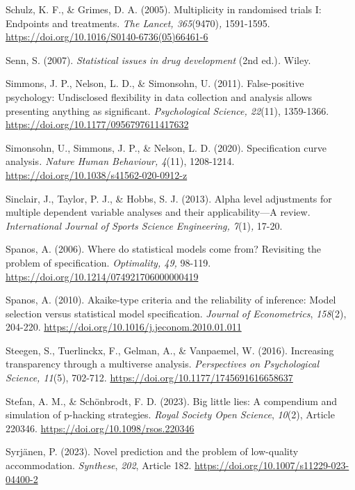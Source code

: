 \documentclass[authordate, meta, issue]{jote-new-article}
\begin{document}
Schulz, K. F., \& Grimes, D. A. (2005). Multiplicity in randomised trials I: Endpoints and treatments. \emph{The Lancet, 365}(9470)\emph{,} 1591-1595. \url{https://doi.org/10.1016/S0140-6736(05)66461-6}



Senn, S. (2007). \emph{Statistical issues in drug development }(2nd ed.)\emph{.} Wiley.



Simmons, J. P., Nelson, L. D., \& Simonsohn, U. (2011). False-positive psychology: Undisclosed flexibility in data collection and analysis allows presenting anything as significant. \emph{Psychological Science, 22}(11), 1359-1366. \url{https://doi.org/10.1177/0956797611417632}



Simonsohn, U., Simmons, J. P., \& Nelson, L. D. (2020). Specification curve analysis\emph{. Nature Human Behaviour, 4}(11), 1208-1214. \url{https://doi.org/10.1038/s41562-020-0912-z}



Sinclair, J., Taylor, P. J., \& Hobbs, S. J. (2013). Alpha level adjustments for multiple dependent variable analyses and their applicability—A review. \emph{International Journal of Sports Science Engineering, 7}(1)\emph{,} 17-20.



Spanos, A. (2006). Where do statistical models come from? Revisiting the problem of specification. \emph{Optimality, 49,} 98-119. \url{https://doi.org/10.1214/074921706000000419}



Spanos, A. (2010). Akaike-type criteria and the reliability of inference: Model selection versus statistical model specification. \emph{Journal of Econometrics}, \emph{158}(2), 204-220. \url{https://doi.org/10.1016/j.jeconom.2010.01.011}



Steegen, S., Tuerlinckx, F., Gelman, A., \& Vanpaemel, W. (2016). Increasing transparency through a multiverse analysis. \emph{Perspectives on Psychological Science, 11}(5), 702-712. \url{https://doi.org/10.1177/1745691616658637}



Stefan, A. M., \& Schönbrodt, F. D. (2023). Big little lies: A compendium and simulation of p-hacking strategies. \emph{Royal Society Open Science}, \emph{10}(2), Article 220346. \url{https://doi.org/10.1098/rsos.220346}



Syrjänen, P. (2023). Novel prediction and the problem of low-quality accommodation. \emph{Synthese}, \emph{202}, Article 182. \url{https://doi.org/10.1007/s11229-023-04400-2}
\end{document}
